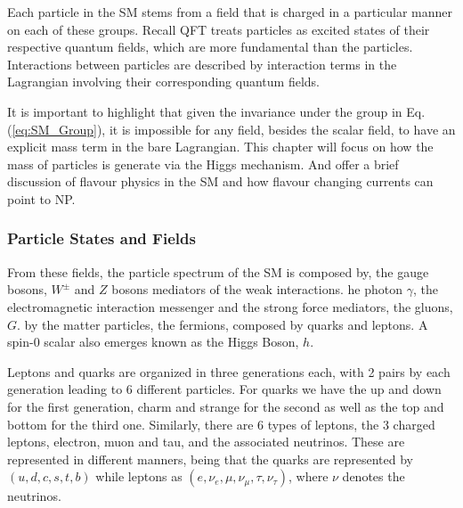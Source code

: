 Each particle in the SM stems from a field that is charged in a particular manner on each of these groups.  
%
Recall  QFT treats particles as excited states of their respective quantum fields, which are more fundamental than the particles. 
%
Interactions between particles are described by interaction terms in the Lagrangian involving their corresponding quantum fields.
%

It is important to highlight that given the invariance under the group in Eq.\,(\ref{eq:SM_Group}), it is impossible for any field, besides the scalar field, to have an explicit mass term in the bare Lagrangian.
%
This chapter will focus on how the mass of particles is generate via the Higgs mechanism.
%
And offer a brief discussion of flavour physics in the SM and how flavour changing currents can point to NP. 


\subsubsection{Particle States and Fields}

From these fields, the particle spectrum of the SM is composed by, the gauge bosons, $W^\pm$ and $Z$ bosons\Joaoadd{,} mediators of the weak interactions. he photon $\gamma$, the electromagnetic interaction messenger and the strong force mediators, the gluons, $G$.  by the matter particles, the fermions, composed by  quarks and leptons. A spin-0 scalar also emerges known as the Higgs Boson, $h$. 

Leptons and quarks are organized in three generations each, with 2 pairs by each generation leading to 6 different particles. 
%
For quarks we have the up and down for the first generation, charm and strange for the second as well as the top and bottom for the third one. 
%
Similarly, there are 6 types of leptons, the 3 charged leptons, electron, muon and tau, and the associated neutrinos. These are represented in different manners, being that the quarks are represented by  $(u,d,c,s,t,b)$ while leptons as $(e,\nu_{e},\mu,\nu_{\mu},\tau,\nu_{\tau})$, where $\nu$ denotes the neutrinos. 

